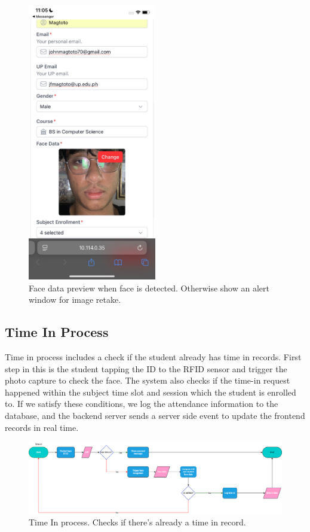 \begin{figure}[h] %
	\centering
	\includegraphics[width=0.5\textwidth]{figures/chapter4/student_form_mobile_preview.jpg} %
	\caption{Face data preview when face is detected. Otherwise show an alert window for image retake.}
	\label{fig:student_form_mobile_preview}
\end{figure}
\clearpage
\subsection{Time In Process}
Time in process includes a check if the student already has time in records. First step in this is the student tapping the ID to the RFID sensor and trigger the photo capture to check the face. The system also checks if the time-in request happened within the subject time slot and session which the student is enrolled to. If we satisfy these conditions, we log the attendance information to the database, and the backend server sends a server side event to update the frontend records in real time.
\begin{figure}[h] %
	\centering
	\includegraphics[width=1.0\textwidth]{figures/chapter4/Timein2.png} %
	\caption{Time In process. Checks if there's already a time in record.}
	\label{fig:timein}
\end{figure}

